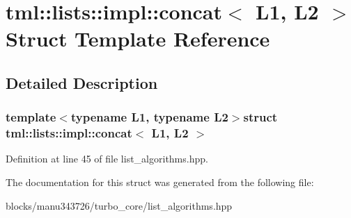 \hypertarget{structtml_1_1lists_1_1impl_1_1concat}{\section{tml\+:\+:lists\+:\+:impl\+:\+:concat$<$ L1, L2 $>$ Struct Template Reference}
\label{structtml_1_1lists_1_1impl_1_1concat}
}


\subsection{Detailed Description}
\subsubsection*{template$<$typename L1, typename L2$>$struct tml\+::lists\+::impl\+::concat$<$ L1, L2 $>$}



Definition at line 45 of file list\+\_\+algorithms.\+hpp.



The documentation for this struct was generated from the following file\+:\begin{DoxyCompactItemize}
\item 
blocks/manu343726/turbo\+\_\+core/list\+\_\+algorithms.\+hpp\end{DoxyCompactItemize}
